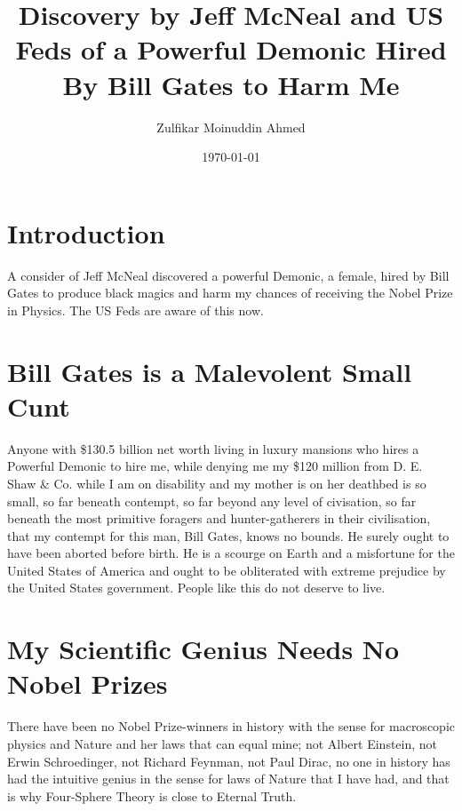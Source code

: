 \documentclass{amsart}
\title{Discovery by Jeff McNeal and US Feds of a Powerful Demonic Hired By Bill Gates to Harm Me}
\author{Zulfikar Moinuddin Ahmed}
\date{\today}
\begin{document}
\maketitle


\section{Introduction}

A consider of Jeff McNeal discovered a powerful Demonic, a female, hired by Bill Gates to produce black magics and harm my chances of receiving the Nobel Prize in Physics.  The US Feds are aware of this now.

\section{Bill Gates is a Malevolent Small Cunt}

Anyone with \$130.5 billion net worth living in luxury mansions who hires a Powerful Demonic to hire me, while denying me my \$120 million from D. E. Shaw \& Co. while I am on disability and my mother is on her deathbed is so small, so far beneath contempt, so far beyond any level of civisation, so far beneath the most primitive foragers and hunter-gatherers in their civilisation, that my contempt for this man, Bill Gates, knows no bounds.  He surely ought to have been aborted before birth.  He is a scourge on Earth and a misfortune for the United States of America and ought to be obliterated with extreme prejudice by the United States government.  People like this do not deserve to live.

\section{My Scientific Genius Needs No Nobel Prizes}

There have been no Nobel Prize-winners in history with the sense for macroscopic physics and Nature and her laws that can equal mine; not Albert Einstein, not Erwin Schroedinger, not Richard Feynman, not Paul Dirac, no one in history has had the intuitive genius in the sense for laws of Nature that I have had, and that is why Four-Sphere Theory is close to Eternal Truth.
\end{document}
